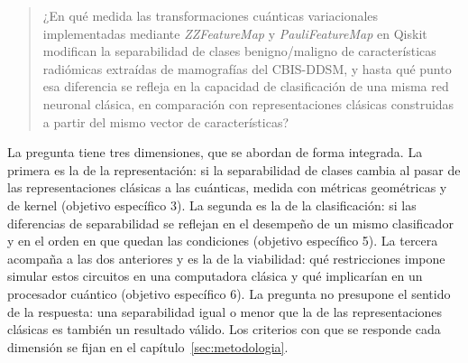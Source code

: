 \begin{quote}
  ¿En qué medida las transformaciones cuánticas variacionales implementadas mediante
  \textit{ZZFeatureMap} y \textit{PauliFeatureMap} en Qiskit modifican la separabilidad de clases
  benigno/maligno de características radiómicas extraídas de mamografías del CBIS-DDSM, y hasta qué
  punto esa diferencia se refleja en la capacidad de clasificación de una misma red neuronal
  clásica, en comparación con representaciones clásicas construidas a partir del mismo vector de
  características?
\end{quote}

La pregunta tiene tres dimensiones, que se abordan de forma integrada. La primera es la de la
representación: si la separabilidad de clases cambia al pasar de las representaciones clásicas a
las cuánticas, medida con métricas geométricas y de kernel (objetivo específico 3). La segunda es
la de la clasificación: si las diferencias de separabilidad se reflejan en el desempeño de un mismo
clasificador y en el orden en que quedan las condiciones (objetivo específico 5). La tercera
acompaña a las dos anteriores y es la de la viabilidad: qué restricciones impone simular estos
circuitos en una computadora clásica y qué implicarían en un procesador cuántico (objetivo
específico 6). La pregunta no presupone el sentido de la respuesta: una separabilidad igual o menor
que la de las representaciones clásicas es también un resultado válido. Los criterios con que se
responde cada dimensión se fijan en el capítulo~\ref{sec:metodologia}.
